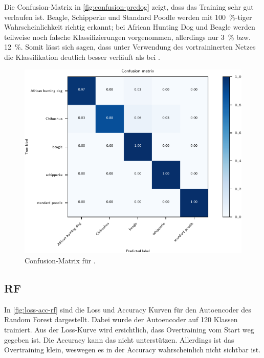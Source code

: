 Die Confusion-Matrix in \autoref{fig:confusion-predog} zeigt, dass das Training sehr gut
verlaufen ist. Beagle, Schipperke und Standard Poodle werden mit \SI{100}{\percent}-tiger
Wahrscheinlichkeit richtig erkannt; bei African Hunting Dog und Beagle werden teilweise
noch falsche Klassifizierungen vorgenommen, allerdings nur \SI{3}{\percent} bzw.
\SI{12}{\percent}. Somit lässt sich sagen, dass unter Verwendung des vortraininerten
Netzes die Klassifikation deutlich besser verläuft als bei \MiniDog.

\begin{figure}
  \centering
  \includegraphics[scale=0.8]{pics/ergebnisse/PreDogNN/confusion_matrix.pdf}
  \caption{Confusion-Matrix für \PreDog.}
  \label{fig:confusion-predog}
\end{figure}

\subsection{RF}

In \autoref{fig:loss-acc-rf} sind die Loss und Accuracy Kurven für den Autoencoder
des Random Forest dargestellt. Dabei wurde der Autoencoder auf 120 Klassen trainiert.
Aus der Loss-Kurve wird ersichtlich, dass Overtraining vom Start weg gegeben ist.
Die Accuracy kann das nicht unterstützen. Allerdings ist das Overtraining klein,
weswegen es in der Accuracy wahrscheinlich nicht sichtbar ist.


